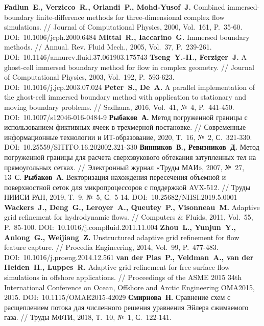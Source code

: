 \begin{thebibliography}{99}
%
\textbf{Fadlun~E., Verzicco~R., Orlandi~P., Mohd-Yusof~J.} Combined immersed-boundary finite-difference methods for three-dimensional complex flow simulations. // Journal of Computational Physics, 2000, Vol.~161, P.~35-60. DOI:~10.1006/jcph.2000.6484
%
\textbf{Mittal~R., Iaccarino~G.} Immersed boundary methods. // Annual. Rev. Fluid Mech., 2005, Vol.~37, P.~239-261. DOI:~10.1146/annurev.fluid.37.061903.175743
%
\textbf{Tseng~Y.-H., Ferziger~J.} A ghost-cell immersed boundary method for flow in complex geometry. // Journal of Computational Physics, 2003, Vol.~192, P.~593-623. DOI:~10.1016/j.jcp.2003.07.024
%
\textbf{Peter~S., De~A.} A parallel implementation of the ghost-cell immersed boundary method with application to stationary and moving boundary problems. // Sadhana, 2016, Vol.~41, №~4, P.~441-450. DOI:~10.1007/s12046-016-0484-9
%
\textbf{Рыбаков~А.} Метод погруженной границы с использованием фиктивных ячеек в трехмерной постановке. // Современные информационные технологии и ИТ-образование, 2020, Т.~16, №~2, С.~321-330. DOI:~10.25559/SITITO.16.202002.321-330
%
\textbf{Винников~В., Ревизников~Д.} Метод погруженной границы для расчета сверхзвукового обтекания затупленных тел на прямоугольных сетках. // Электронный журнал «Труды МАИ», 2007, №~27, 13~С.
%
\textbf{Рыбаков~А.} Векторизация нахождения пересечения объемной и поверхностной сеток для микропроцессоров с поддержкой AVX-512. // Труды НИИСИ РАН, 2019, Т.~9, №~5, С.~5-14. DOI:~10.25682/NIISI.2019.5.0001
%
\textbf{Wackers~J., Deng~G., Leroyer~A., Queutey~P., Visonneau~M.} Adaptive grid refinement for hydrodynamic flows. // Computers \& Fluids, 2011, Vol.~55, P.~85-100. DOI:~10.1016/j.compfluid.2011.11.004
%
\textbf{Zhou~L., Yunjun~Y., Anlong~G., Weijiang~Z.} Unstructured adaptive grid refinement for flow feature capture. // Procedia Engineering, 2014, Vol.~99, P.~477-483. DOI:~10.1016/j.proeng.2014.12.561
%
\textbf{van der Plas~P., Veldman~A., van der Heiden~H., Luppes~R.} Adaptive grid refinement for free-surface flow simulations in offshore applications. // Proceedings of the ASME 2015 34th International Conference on Ocean, Offshore and Arctic Engineering OMA2015, 2015. DOI:~10.1115/OMAE2015-42029
%
\textbf{Смирнова~Н.} Сравнение схем с расщеплением потока для численного решения уравнения Эйлера сжимаемого газа. // Труды МФТИ, 2018, Т.~10, №~1, С.~122-141.
%




\end{thebibliography}
